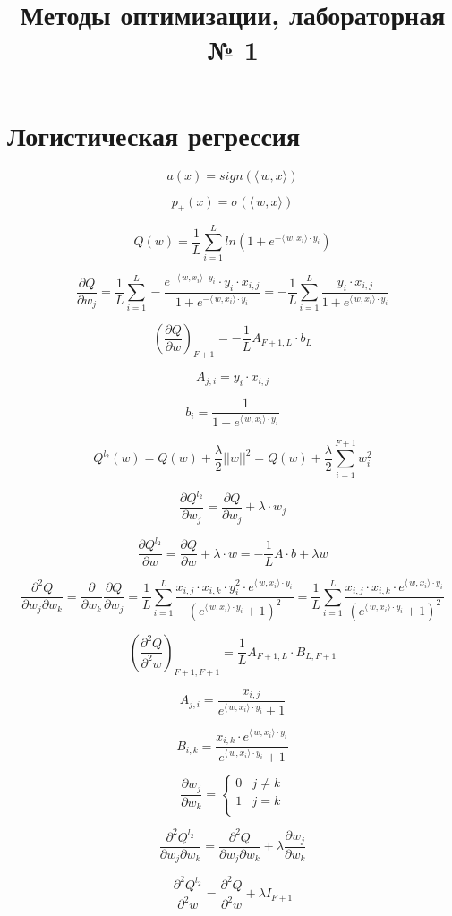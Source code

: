 \documentclass[12pt]{article}
\title{Методы оптимизации, лабораторная № 1}
\begin{document}
	\maketitle
	
\section{Логистическая регрессия}
$$a(x) = sign(\langle\,w,x\rangle)$$

$$p_+(x) = \sigma(\langle\,w,x\rangle)$$

$$Q(w) = \frac{1}{L}\sum\limits_{i = 1}^L ln(1 + e^{-\langle\,w,x_i\rangle\cdot y_i})$$

$$\frac{\partial Q}{\partial w_j} = \frac{1}{L}\sum\limits_{i = 1}^{L}-\frac{e^{-\langle\,w,x_i\rangle\cdot y_i} \cdot y_i \cdot x_{i, j}}{1 + e^{-\langle\,w,x_i\rangle\cdot y_i}} = -\frac{1}{L}\sum\limits_{i = 1}^{L}\frac{y_i \cdot x_{i, j}}{1 + e^{\langle\,w,x_i\rangle\cdot y_i}} $$

\[ 
\left( \frac{\partial Q}{\partial w} \right)_{F+1} =-\frac{1}{L} A_{F+1, L} \cdot b_{L}
\]

$$A_{j, i} = y_{i} \cdot x_{i, j}$$

$$b_i = \frac{1}{1 + e^{\langle\,w,x_i\rangle\cdot y_i}}$$

$$Q^{l_2}(w) = Q(w) + \frac{\lambda}{2}||w||^2 = Q(w) + \frac{\lambda}{2} \sum\limits_{i = 1}^{F+1}w_i^2$$

$$\frac{\partial Q^{l_2}}{\partial w_j} = \frac{\partial Q}{\partial w_j}  + \lambda \cdot w_j $$

$$\frac{\partial Q^{l_2}}{\partial w} = \frac{\partial Q}{\partial w}  + \lambda \cdot w = -\frac{1}{L} A \cdot b + \lambda w$$

$$\frac{\partial^2 Q}{\partial w_j \partial w_k} = \frac{\partial}{\partial w_k} \frac{\partial Q}{\partial w_j} = \frac{1}{L}\sum\limits_{i = 1}^{L} \frac{x_{i, j} \cdot x_{i, k} \cdot y_i^2 \cdot e^{\langle\,w,x_i\rangle \cdot y_i}}{(e^{\langle\,w,x_i\rangle \cdot y_i} + 1)^2} = \frac{1}{L}\sum\limits_{i = 1}^{L} \frac{x_{i, j} \cdot x_{i, k} \cdot e^{\langle\,w,x_i\rangle \cdot y_i}}{(e^{\langle\,w,x_i\rangle \cdot y_i} + 1)^2}$$

\[ 
\left( \frac{\partial^2 Q}{\partial^2 w} \right)_{F+1, F+1} =\frac{1}{L} A_{F+1, L} \cdot B_{L, F+1}
\]

$$A_{j, i} = \frac{x_{i, j}}{e^{\langle\,w,x_i\rangle \cdot y_i} + 1}$$

$$B_{i, k} = \frac{x_{i, k} \cdot e^{\langle\,w,x_i\rangle \cdot y_i}}{e^{\langle\,w,x_i\rangle \cdot y_i} + 1}$$

\[\frac{\partial w_j}{\partial w_k} = \begin{cases} 
      0 & j \neq k\\
     1 & j = k \\
   \end{cases}
\]

$$\frac{\partial^2 Q^{l_2}}{\partial w_j \partial w_k} = \frac{\partial^2 Q}{\partial w_j \partial w_k} + \lambda \frac{\partial w_j}{\partial w_k}$$

$$\frac{\partial^2 Q^{l_2}}{\partial^2 w} = \frac{\partial^2 Q}{\partial^2 w} + \lambda I_{F+1}$$
\end{document}

